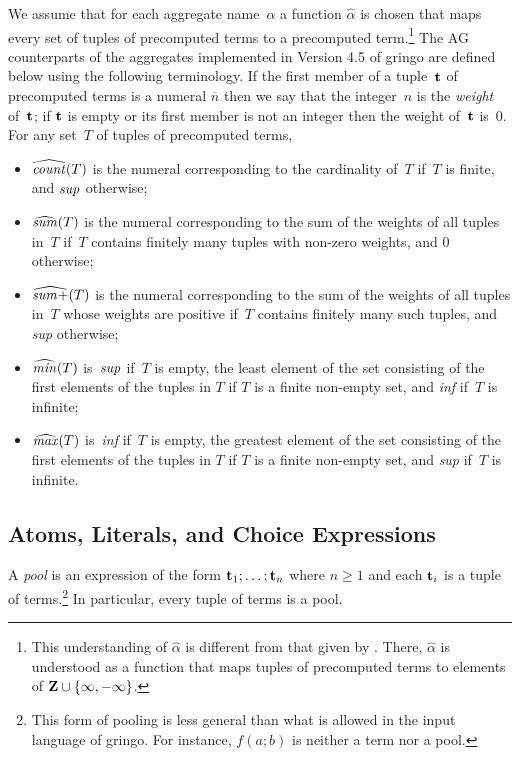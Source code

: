 \documentclass{tlp}
\begin{document}
We assume that for each aggregate name~$\alpha$ a function $\widehat \alpha$
is chosen that maps every set of tuples of precomputed terms to a precomputed 
term.\footnote{\label{ft3}This understanding of $\widehat \alpha$ is different from that 
given by  \citeyear[Section~3.3]{har14a}. There, $\widehat \alpha$ is understood as
a function that maps tuples of precomputed terms to elements of $\bf Z \cup
\{\infty, - \infty\}$. } 
The AG counterparts of the aggregates implemented in Version 4.5 of
{\sc gringo} are defined below using the following terminology.
If the first member of a tuple~$\bf t$
of precomputed terms is a numeral $\overline n$ then we say that the integer~$n$ is
the {\sl weight} of~$\bf t$; if $\bf t$ is empty or its first member is not
an integer then the weight of~$\bf t$ is~0.
For any set~$T$ of tuples of precomputed terms,
\begin{itemize}
\item $\widehat{{\it count}}(T)$ is the numeral corresponding to the cardinality of~$T$ if~$T$ is finite, and
${\it sup}$ otherwise;
\item $\widehat{{\it sum}}(T)$ is the numeral corresponding to the sum of the 
weights of all tuples in~$T$
if~$T$ contains finitely many tuples with non-zero weights, and $0$ otherwise;
\item $\widehat{{\it sum+}}(T)$ is the numeral corresponding to the sum of the 
weights of all tuples in~$T$
whose weights are positive if~$T$ contains finitely many such tuples,
and {\it sup} otherwise;
\item $\widehat{{\it min}}(T)$ is~${\it sup}$ if~$T$ is empty, the 
least element of the set consisting of the first elements of the tuples in $T$ 
if $T$ is a finite non-empty set, and {\it inf} if~$T$ is infinite;
\item
$\widehat{{\it max}}(T)$ is~{\it inf} if~$T$ is empty, the greatest element 
of the set consisting of the first elements of the tuples in $T$ 
if $T$ is a finite non-empty set, and {\it sup} if~$T$ is infinite.
\end{itemize}

\subsection{Atoms, Literals, and Choice Expressions}

A {\sl pool} is an expression of the form
${\bf t}_1 ; \dots ; {\bf t}_n$  where $n \geq 1$ and each ${\bf t}_i$  
is a tuple of terms.\footnote{This form of pooling is less general than what
is allowed in the input language of {\sc gringo}.  For instance, $f(a;b)$ is
neither a term nor a pool.}
In particular, every tuple of terms is a pool.   
\end{document}
